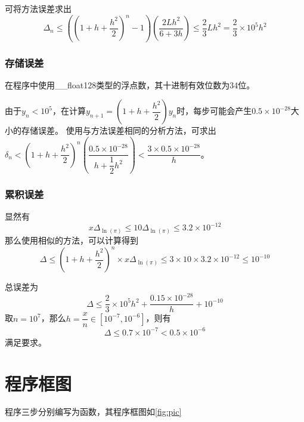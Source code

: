 \documentclass[11pt,a4paper]{ctexart}
\begin{document}
可将方法误差求出
$$\Delta_n \le \left((1+h+\dfrac{h^2}{2})^n-1\right)(\dfrac{2Lh^2}{6+3h}) \le \dfrac{2}{3}Lh^2 = \dfrac{2}{3} \times 10^5 h^2$$

\subsubsection{存储误差}
在程序中使用\_\_float128类型的浮点数，其十进制有效位数为34位。

由于$y_n < 10^5$，在计算$y_{n+1} = (1+h+\dfrac{h^2}{2})y_n$时，每步可能会产生$0.5 \times 10^{-28}$大小的存储误差。
使用与方法误差相同的分析方法，可求出$\delta_n < (1+h+\dfrac{h^2}{2})^n(\dfrac{0.5\times 10^{-28}}{h+\dfrac{1}{2}h^2}) < \dfrac{3\times 0.5 \times 10^{-28}}{h}$。

\subsubsection{累积误差}
显然有
$$x\Delta_{\ln(\pi)} \le 10 \Delta_{\ln(\pi)} \le 3.2 \times 10^{-12}$$
那么使用相似的方法，可以计算得到
$$\Delta \le (1+h+\dfrac{h^2}{2})^n \times x\Delta_{\ln(\pi)} \le 3 \times 10 \times 3.2 \times 10^{-12} \le 10^{-10}$$


总误差为
$$\Delta \le \dfrac{2}{3}\times 10^5 h^2 + \dfrac{0.15\times 10^{-28}}{h} + 10^{-10}$$
取$n = 10^7$，那么$h = \dfrac{x}{n} \in [10^{-7}, 10^{-6}]$，则有
$$\Delta \le 0.7 \times 10^{-7} < 0.5 \times 10^{-6}$$
满足要求。

\clearpage

\section{程序框图}
程序三步分别编写为函数，其程序框图如\ref{fig:pic}
\end{document}

